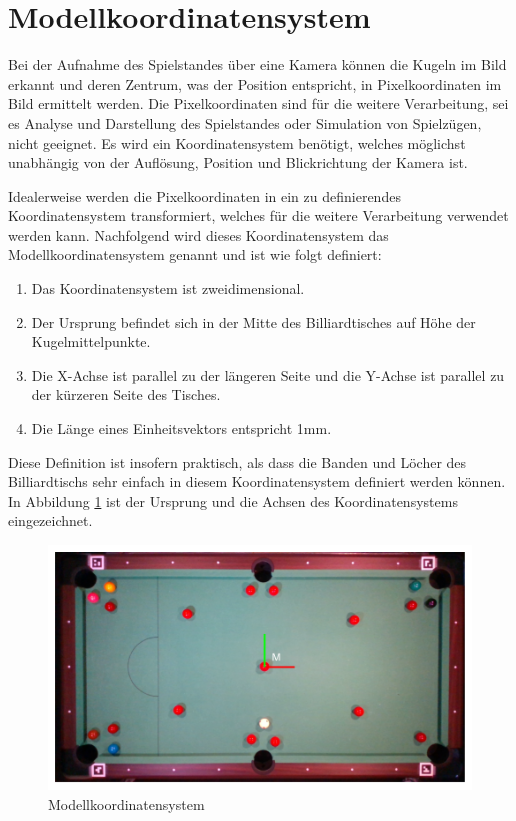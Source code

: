\section{Modellkoordinatensystem}\label{kap:model_coordinate_system}

Bei der Aufnahme des Spielstandes über eine Kamera können die Kugeln im Bild erkannt und deren Zentrum, was der
Position entspricht, in Pixelkoordinaten im Bild ermittelt werden.
Die Pixelkoordinaten sind für die weitere Verarbeitung, sei es Analyse und Darstellung des Spielstandes oder Simulation
von Spielzügen, nicht geeignet. Es wird ein Koordinatensystem benötigt, welches möglichst unabhängig von der Auflösung,
Position und Blickrichtung der Kamera ist.

Idealerweise werden die Pixelkoordinaten in ein zu definierendes Koordinatensystem transformiert, welches für die weitere
Verarbeitung verwendet werden kann. Nachfolgend wird dieses Koordinatensystem das Modellkoordinatensystem genannt
und ist wie folgt definiert:
\begin{enumerate}
  \item Das Koordinatensystem ist zweidimensional.
  \item Der Ursprung befindet sich in der Mitte des Billiardtisches auf Höhe der Kugelmittelpunkte.
  \item Die X-Achse ist parallel zu der längeren Seite und die Y-Achse ist parallel zu der kürzeren Seite des Tisches.
  \item Die Länge eines Einheitsvektors entspricht 1\si{\milli\metre}.
\end{enumerate}

Diese Definition ist insofern praktisch, als dass die Banden und Löcher des Billiardtischs sehr einfach in diesem
Koordinatensystem definiert werden können.
In Abbildung \ref{fig:table_model_coordinate_system} ist der Ursprung und die Achsen des Koordinatensystems eingezeichnet.

\begin{figure}[h!]
    \begin{center}
    \includegraphics[width=0.8\linewidth]{../common/resources/coordinate_systems/table_model_coordinate_system.png}
    \end{center}
    \caption{Modellkoordinatensystem}
    \label{fig:table_model_coordinate_system}
\end{figure}

